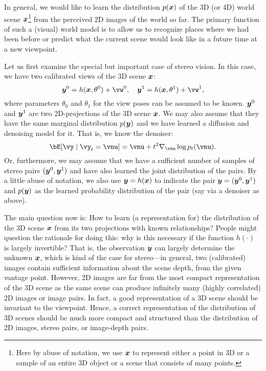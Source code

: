 \documentclass[../../book-main.tex]{subfiles}
\begin{document}
In general, we would like to learn the distribution $p(\bm{x})$ of the 3D (or 4D) world scene $\bm{x}$\footnote{Here by abuse of notation, we use $\bm{x}$ to represent either a point in 3D or a sample of an entire 3D object or a scene that consists of many points.} from the perceived 2D images of the world so far. The primary function of such a (visual) world model is to allow us to recognize places where we had been before or predict what the current scene would look like in a future time at a new viewpoint. 

Let us first examine the special but important case of stereo vision. In this case, we have two calibrated views of the 3D scene $\bm{x}$:
\begin{equation}
    \y^0 = h(\x, \theta^0) +\vw^0, \quad \y^1 = h(\x, \theta^1) +\vw^1, 
\end{equation}
where parameters $\theta_0$ and $\theta_1$ for the view poses can be assumed to be known. $\bm{y}^0$ and $\bm{y}^1$ are two 2D-projections of the 3D scene $\bm{x}$. We may also assume that they have the same marginal distribution $p(\bm{y})$ and we have learned a diffusion and denoising model for it. That is, we know the denoiser:
\begin{equation}
  \bE[\vy \mid \vy_t=\vnu] =
  \vnu + t^2 \nabla_{\vnu}\log p_t(\vnu). 
 \label{eq:y-posterior-sampling-denoiser}    
\end{equation}
Or, furthermore, we may assume that we have a sufficient number of samples of stereo pairs $(\bm{y}^0, \bm{y}^1)$ and have also learned the joint distribution of the pairs. By a little abuse of notation, we also use $\bm{y} = h(\bm{x})$ to indicate the pair $\bm{y} = (\bm{y}^0, \bm{y}^1)$ and $p(\bm{y})$ as the learned probability distribution of the pair (say via a denoiser as above).  

The main question now is: How to learn (a representation for) the distribution of the 3D scene $\bm{x}$ from its two projections with known relationships? 
People might question the rationale for doing this: why is this necessary if the function $h(\cdot)$ is largely invertible? That is, the observation $\bm{y}$ can largely determine the unknown $\bm{x}$, which is kind of the case for stereo—in general, two (calibrated) images contain sufficient information about the scene depth, from the given vantage point. However, 2D images are far from the most compact representation of the 3D scene as the same scene can produce infinitely many (highly correlated) 2D images or image pairs. In fact, a good representation of a 3D scene should be invariant to the viewpoint. Hence, a correct representation of the distribution of 3D scenes should be much more compact and structured than the distribution of 2D images, stereo pairs, or image-depth pairs. 
\end{document}
